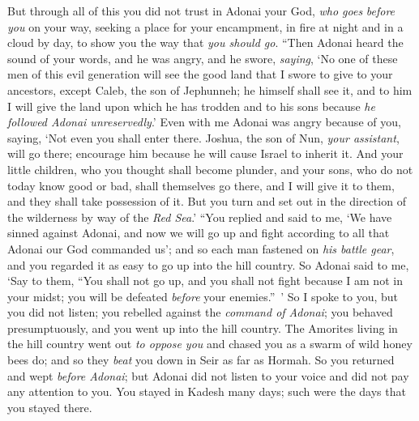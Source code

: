 \begin{biblechapter}
\verse But through all of this you did not trust in Adonai your God,
\verse \textit{who goes} \textit{before you} on your way, seeking a place for your encampment, in fire at night and in a cloud by day, to show you the way that \textit{you should go}.
\verse “Then Adonai heard the sound of your words, and he was angry, and he swore, \textit{saying},
\verse ‘No one of these men of this evil generation will see the good land that I swore to give to your ancestors,
\verse except Caleb, the son of Jephunneh; he himself shall see it, and to him I will give the land upon which he has trodden and to his sons because \textit{he followed Adonai unreservedly}.’
\verse Even with me Adonai was angry because of you, saying, ‘Not even you shall enter there.
\verse Joshua, the son of Nun, \textit{your assistant}, will go there; encourage him because he will cause Israel to inherit it.
\verse And your little children, who you thought shall become plunder, and your sons, who do not today know good or bad, shall themselves go there, and I will give it to them, and they shall take possession of it.
\verse But you turn and set out in the direction of the wilderness by way of the \textit{Red Sea}.’
\verse “You replied and said to me, ‘We have sinned against Adonai, and now we will go up and fight according to all that Adonai our God commanded us’; and so each man fastened on \textit{his battle gear}, and you regarded it as easy to go up into the hill country.
\verse So Adonai said to me, ‘Say to them, “You shall not go up, and you shall not fight because I am not in your midst; you will be defeated \textit{before} your enemies.” ’
\verse So I spoke to you, but you did not listen; you rebelled against the \textit{command of Adonai}; you behaved presumptuously, and you went up into the hill country.
\verse The Amorites living in the hill country went out \textit{to oppose you} and chased you as a swarm of wild honey bees do; and so they \textit{beat} you down in Seir as far as Hormah.
\verse So you returned and wept \textit{before Adonai}; but Adonai did not listen to your voice and did not pay any attention to you.
\verse You stayed in Kadesh many days; such were the days that you stayed there.
\end{biblechapter}

